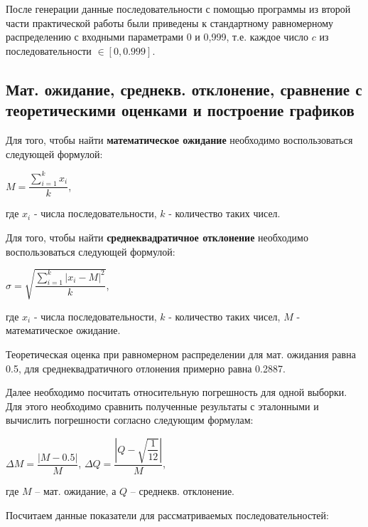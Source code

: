\documentclass[bachelor, och, coursework]{shiza}
\begin{document}
	После генерации данные последовательности с помощью программы из второй части практической работы были приведены к стандартному равномерному распределению с входными параметрами 0 и 0,999, т.е. каждое число $c$ из последовательности $\in [0, 0.999]$.
	
	\subsection{Мат. ожидание, среднекв. отклонение, сравнение с теоретическими оценками и построение графиков}
	
	Для того, чтобы найти \textbf{математическое ожидание} необходимо воспользоваться следующей формулой:
	
	\begin{center}
		$M = \dfrac{\sum_{i = 1}^{k} x_i}{k}$,
	\end{center}

	где $x_i$ - числа последовательности, $k$ - количество таких чисел.
	
	Для того, чтобы найти \textbf{среднеквадратичное отклонение} необходимо воспользоваться следующей формулой:
	
	\begin{center}
		$\sigma = \sqrt{\dfrac{\sum_{i = 1}^{k} |x_i - M|^2}{k}}$,
	\end{center}
	
	где $x_i$ - числа последовательности, $k$ - количество таких чисел, $M$ - математическое ожидание.
	
	Теоретическая оценка при равномерном распределении для мат. ожидания равна 0.5, для среднеквадратичного отлонения примерно равна 0.2887.
	
	Далее необходимо посчитать относительную погрешность для одной выборки. Для этого необходимо сравнить полученные результаты с эталонными и вычислить погрешности согласно следующим формулам: 
	
		\begin{center}
			$\Delta M = \dfrac{|M - 0.5|}{M}$, $\Delta Q = \dfrac{|Q - \sqrt{\dfrac{1}{12}}|}{M}$,
		\end{center}
			
	 где $M$ – мат. ожидание, а $Q$ – среднекв. отклонение.
	
	Посчитаем данные показатели для рассматриваемых последовательностей:
\end{document}
